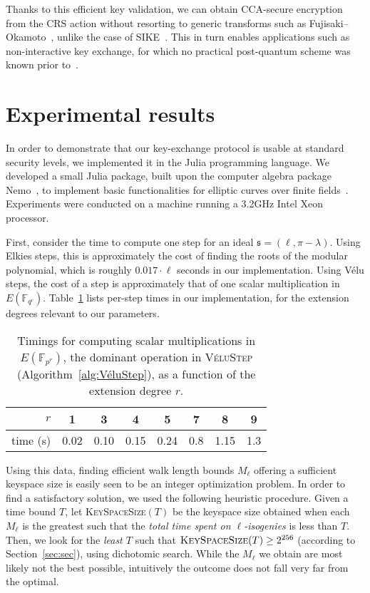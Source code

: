 \documentclass{llncs}
\newcommand{\F}{\mathbb{F}}
\newcommand{\algstyle}[1]{\textsc{#1}}
\renewcommand{\frak}{\mathfrak}
\begin{document}
Thanks to this efficient key validation, 
we can obtain CCA-secure encryption from the
CRS action without resorting to generic transforms such as
Fujisaki--Okamoto~\cite{10.1007/3-540-48405-1_34}, unlike the case of
SIKE~\cite{SIKE,10.1007/978-3-319-70500-2_12}. This in turn enables
applications such as non-interactive key exchange, for which no
practical post-quantum scheme was known prior to~\cite{csidh}.


\section{Experimental results}
\label{sec:exp}

In order to demonstrate that our key-exchange protocol is usable
at standard security levels, we implemented it in the Julia
programming language.
We developed a small Julia package, built upon 
the computer algebra package Nemo~\cite{nemo},
to implement basic functionalities
for elliptic curves over finite fields~\cite{package}.
Experiments were conducted on a machine running a 3.2GHz Intel Xeon processor.

First, consider the
time to compute one step for an ideal $\frak s = (\ell,\pi-\lambda)$.
Using Elkies steps, this is approximately
the cost of finding the roots of the modular polynomial,
which is roughly $0.017\cdot\ell$ seconds in our implementation.
Using Vélu steps, the cost of a step is approximately
that of one scalar multiplication in $E(\F_{q^r})$.
Table~\ref{tab:time-vs-r} lists per-step times in our implementation,
for the extension degrees relevant to our parameters.

\begin{table}
    \centering
    \begin{tabular}{r@{\;}|@{\;}c@{\ \ }c@{\ \ }c@{\ \ }c@{\ \ }c@{\ \ }c@{\ \ }c}
        $r$ & 1 & 3 & 4 & 5 & 7 & 8 & 9 \\
        \hline
        time (s) & 0.02 & 0.10 & 0.15 & 0.24 & 0.8 & 1.15 & 1.3
    \end{tabular}
    \smallskip
    \caption{Timings for computing scalar multiplications in
    $E(\F_{p^r})$, the dominant operation in \algstyle{VéluStep}
    (Algorithm~\ref{alg:VéluStep}), as a function of the extension
    degree $r$.}
    \label{tab:time-vs-r}
\end{table}

Using this data, finding efficient walk length bounds $M_\ell$
offering a sufficient keyspace size is easily seen to be an
integer optimization problem. In order to find a
satisfactory solution, we used the following heuristic procedure.
Given a time bound $T$, let \algstyle{KeySpaceSize}$(T)$ be
the keyspace size obtained when each $M_\ell$ is the greatest such
that the \emph{total time spent on $\ell$-isogenies} is less than $T$.
Then, we look for the \emph{least $T$} such that
$
	\algstyle{KeySpaceSize}(T)\geq 2^{256}
$
(according to Section~\ref{sec:sec}), using dichotomic search.
While the $M_\ell$
we obtain are most likely not the best possible, intuitively
the outcome does not fall very far from the optimal.
\end{document}
